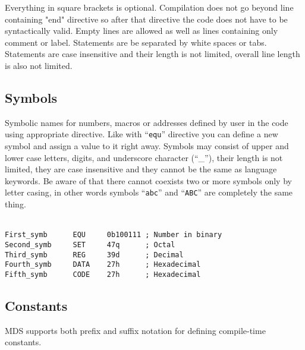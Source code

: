         Everything in square brackets is optional. Compilation does not go beyond line containing "end" directive so after that directive the code does not have to be syntactically valid. Empty lines are allowed as well as lines containing only comment or label. Statements are be separated by white spaces or tabs. Statements are case insensitive and their length is not limited, overall line length is also not limited.

    \subsection{Symbols}
        Symbolic names for numbers, macros or addresses defined by user in the code using appropriate directive. Like with ``\texttt{equ}'' directive you can define a new symbol and assign a value to it right away. Symbols may consist of upper and lower case letters, digits, and underscore character (``\_''), their length is not limited, they are case insensitive and they cannot be the same as language keywords. Be aware of that there cannot coexists two or more symbols only by letter casing, in other words symbols ``\texttt{abc}'' and ``\texttt{ABC}'' are completely the same thing.

        ~\\
        {
            \usecodefont
            \verb'First_symb      EQU     0b100111 ; Number in binary'\\
            \verb'Second_symb     SET     47q      ; Octal'\\
            \verb'Third_symb      REG     39d      ; Decimal'\\
            \verb'Fourth_symb     DATA    27h      ; Hexadecimal'\\
            \verb'Fifth_symb      CODE    27h      ; Hexadecimal'
        }

    \subsection{Constants}
        MDS supports both prefix and suffix notation for defining compile-time constants.

